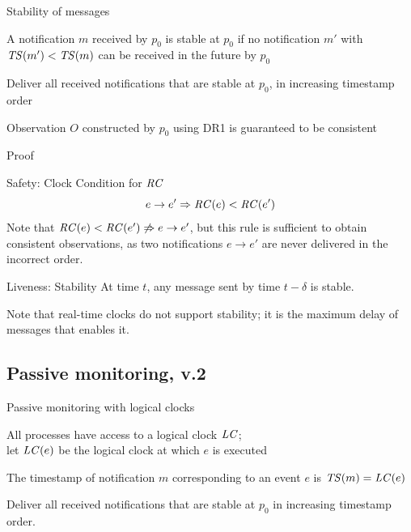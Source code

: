 \begin{frame}{Stability of messages}

\begin{definition}[Stability] A notification  $m$ received by $p_0$ is \alert{stable at $p_0$} if no notification
$m'$ with $\mathit{TS}(m') < \mathit{TS}(m)$ can be received in the future by $p_0$
\end{definition}


\begin{definition}
Deliver all received notifications that are stable at $p_0$, in increasing timestamp order
\end{definition}
\smallskip
\begin{theorem}
Observation $O$ constructed by $p_0$ using DR1 is guaranteed to be
consistent
\end{theorem}


\end{frame}


\begin{frame}{Proof}

\begin{block}{Safety: Clock Condition for $\mathit{RC}$} 
\[
  e \rightarrow e' \Rightarrow \mathit{RC}(e) < \mathit{RC}(e') 
\]
Note that $\mathit{RC}(e) < \mathit{RC}(e') \not\Rightarrow e \rightarrow e'$, but 
this rule is sufficient to obtain consistent observations, as
two notifications $e \rightarrow e'$ are never delivered in the incorrect
order.
\end{block}

\medskip
\begin{block}{Liveness: Stability}
At time $t$, any message sent by time $t-\delta$ is stable.
\end{block}

\medskip
Note that real-time clocks do not support stability; it is the
maximum delay of messages that enables it.
\end{frame}

\subsection{Passive monitoring, v.2}


\begin{frame}{Passive monitoring with logical clocks}

\BI
\item All processes have access to a logical clock $\mathit{LC}$; \\
  let $\mathit{LC}(e)$ be the logical clock at which $e$ is executed
\item The timestamp of notification $m$ corresponding to an event $e$
  is $\mathit{TS}(m) = \mathit{LC}(e)$
\EI

\begin{definition}
Deliver all received notifications that are stable at $p_0$ in increasing timestamp order.
\end{definition}

\end{frame}


